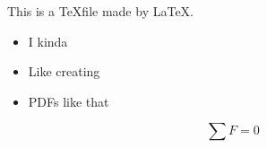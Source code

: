 \documentclass{article}
\begin{document}
    This is a \TeX file made by \LaTeX.
    \begin{itemize}
        \item I kinda 
        \item Like creating
        \item PDFs like that
    \end{itemize}

    \begin{equation}
        \sum F = 0
    \end{equation}

\end{document}
